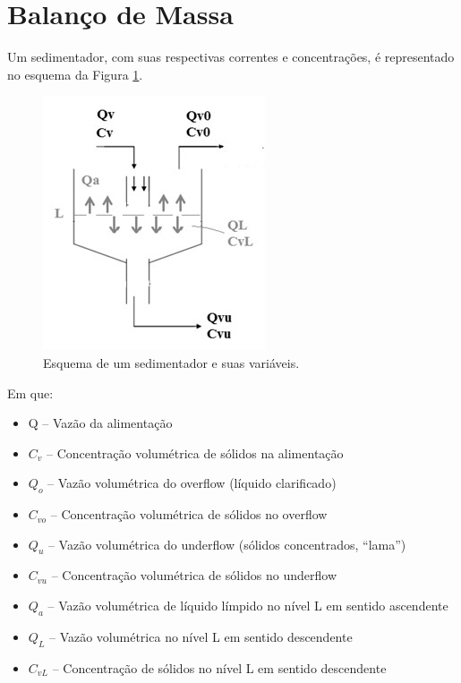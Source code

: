 \section{Balanço de Massa}

Um sedimentador, com suas respectivas correntes e concentrações, é representado no esquema da Figura \ref{esquema}.

\begin{figure}[H]
	\begin{center}
		\includegraphics[scale=.5,trim={0 0 0 0}]{figuras/ladeq/sedi/aparato}
		\caption{Esquema de um sedimentador e suas variáveis.}
		\label{esquema}
	\end{center}
\end{figure}

Em que:

\begin{itemize}
\item Q – Vazão da alimentação
\item $ C_{v} $ – Concentração volumétrica de sólidos na alimentação
\item $ Q_{o} $ – Vazão volumétrica do overflow (líquido clarificado)
\item $ C_{vo} $ – Concentração volumétrica de sólidos no overflow
\item $ Q_{u} $ – Vazão volumétrica do underflow (sólidos concentrados, “lama”)
\item $ C_{vu }$ – Concentração volumétrica de sólidos no underflow
\item $ Q_{a} $ – Vazão volumétrica de líquido límpido no nível L em sentido ascendente
\item $ Q_{L} $ – Vazão volumétrica no nível L em sentido descendente
\item $ C_{vL} $ – Concentração de sólidos no nível L em sentido descendente
\end{itemize}




